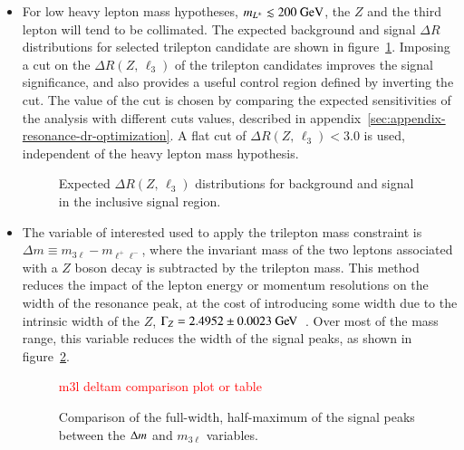 \begin{itemize}
	\item For low heavy lepton mass hypotheses, $m_{L^{\pm}}\lesssim 200~\mbox{GeV}$, the $Z$ and the third lepton will tend to be collimated. The expected background and signal $\Delta R$ distributions for selected trilepton candidate are shown in figure~\ref{fig:resonance-inclusive-dR}. Imposing a cut on the $\Delta R(Z,\,\ell_3)$ of the trilepton candidates improves the signal significance, and also provides a useful control region defined by inverting the cut. The value of the cut is chosen by comparing the expected sensitivities of the analysis with different cuts values, described in appendix~\ref{sec:appendix-resonance-dr-optimization}. A flat cut of $\Delta R(Z,\,\ell_3)<3.0$ is used, independent of the heavy lepton mass hypothesis. 

	\begin{figure}[h]
		\centering
		\caption{Expected $\Delta R(Z,\,\ell_3)$ distributions for background and signal in the inclusive signal region.}
		\label{fig:resonance-inclusive-dR}
	\end{figure}
  
	\item The variable of interested used to apply the trilepton mass constraint is $\Delta m \equiv m_{3\ell}-m_{\ell^+\ell^-}$, where the invariant mass of the two leptons associated with a $Z$ boson decay is subtracted by the trilepton mass. This method reduces the impact of the lepton energy or momentum resolutions on the width of the resonance peak, at the cost of introducing some width due to the intrinsic width of the $Z$, $\Gamma_Z=2.4952\pm0.0023 \GeV$~\cite{pdg}. Over most of the mass range, this variable reduces the width of the signal peaks, as shown in figure~\ref{fig:deltam-m3l-comparison}. 

	\begin{figure}[htbp]
		\textcolor{red}{m3l deltam comparison plot or table}
		\caption{Comparison of the full-width, half-maximum of the signal peaks between the $\Delta m$ and $m_{3\ell}$ variables.}
		\label{fig:deltam-m3l-comparison}
	\end{figure}
	  
\end{itemize}

